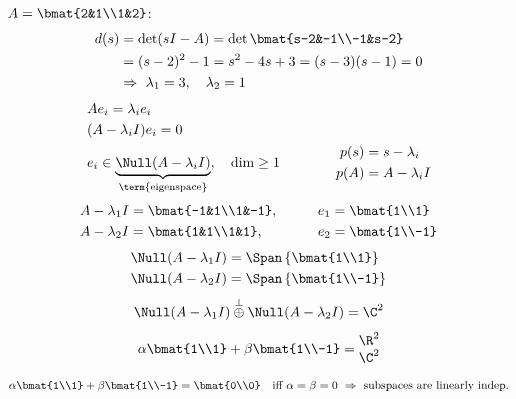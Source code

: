 \begin{example}
$A=\bmat{2&1\\1&2}$:
\begin{align*}
d(s)&=\det(sI-A)=\det\bmat{s-2&-1\\-1&s-2}\\
&=(s-2)^2-1=s^2-4s+3=(s-3)(s-1)=0\\
&\Rightarrow\ \lambda_1=3,\quad\lambda_2=1
\end{align*}
\begin{align*}
&Ae_i=\lambda_ie_i\\
&(A-\lambda_iI)e_i=0\\
&e_i\in\underbrace{\Null(A-\lambda_iI)}_{\text{\term{eigenspace}}},\quad\dim\geq1
\qquad\qquad
\begin{aligned}
p(s)&=s-\lambda_i\\
p(A)&=A-\lambda_iI
\end{aligned}
\end{align*}
\begin{alignat*}{2}
A-\lambda_1I&=\bmat{-1&1\\1&-1},&\qquad e_1&=\bmat{1\\1}\\
A-\lambda_2I&=\bmat{1&1\\1&1},&\qquad e_2&=\bmat{1\\-1}
\end{alignat*}
\begin{align*}
\Null(A-\lambda_1I)&=\Span\left\{\bmat{1\\1}\right\}\\
\Null(A-\lambda_2I)&=\Span\left\{\bmat{1\\-1}\right\}
\end{align*}
\[
\Null(A-\lambda_1I)\overset{\perp}{\oplus}\Null(A-\lambda_2I)=\C^2
\]
\[
\alpha\bmat{1\\1}+\beta\bmat{1\\-1}=\begin{matrix}\R^2\\\C^2\end{matrix}
\]
\[
\alpha\bmat{1\\1}+\beta\bmat{1\\-1}=\bmat{0\\0}\quad\text{iff }\alpha=\beta=0
\ \Rightarrow\ \text{subspaces are linearly indep.}
\]
\end{example}


